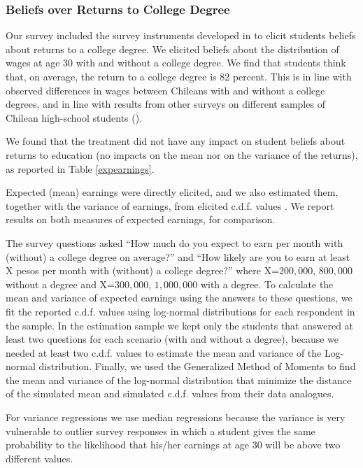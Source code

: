 	\subsubsection{Beliefs over Returns to College Degree}\label{sec:additional_belief_data}
		Our survey included the survey instruments developed in \citealp{attanasio2014education} to elicit students beliefs about returns to a college degree. We elicited beliefs about the distribution of wages at age 30 with and without a college degree. We find that students think that, on average, the return to a college degree is 82 percent. This is in line with observed differences in wages between Chileans with and without a college degrees, and in line with results from other surveys on different samples of Chilean high-school students (\citealp*{hastings2016informed}).\par 
		
		We found that the treatment did not have any impact on student beliefs about returns to education (no impacts on the mean nor on the variance of the returns), as reported in Table \ref{expearnings}.
		
		

		Expected (mean) earnings were directly elicited, and we also estimated them, together with the variance of earnings, from elicited c.d.f. values \citep{miglino_tincani_subjective_earnings_2026}. We report results on both measures of expected earnings, for comparison.\par
		The survey questions asked “How much do you expect to earn per month with (without) a college degree on average?” and “How likely are you to earn at least X pesos per month with (without) a college degree?” where X={$200,000$, $800,000$} without a degree and  X={$300,000$, $1,000,000$} with a degree. To calculate the mean and variance of expected earnings using the answers to these questions, we fit the reported c.d.f. values using log-normal distributions for each respondent in the sample. In the estimation sample we kept only the students that answered at least two questions for each scenario (with and without a degree), because we needed at least two c.d.f. values to estimate the mean and variance of the Log-normal distribution. Finally, we used the Generalized Method of Moments to find the mean and variance of the log-normal distribution that minimize the distance of the simulated mean and simulated c.d.f. values from their data analogues.\par
		For variance regressions we use median regressions because the variance is very vulnerable to outlier survey responses in which a student gives the same probability to the likelihood that his/her earnings at age $30$ will be above two different values. 
	
